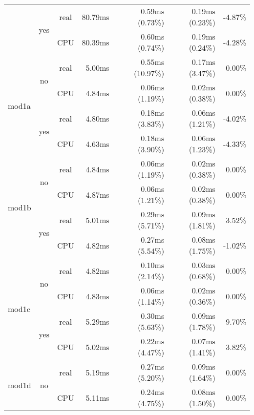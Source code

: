 \documentclass[en]{pracamgr}
\begin{document}
\begin{appendices}
\begin{small}
\begin{longtable}{|l|c|c|r|r|r|r|}
                          \cline{2-7}
                          & \multirow{2}{*}{yes} & real & 80.79ms & 0.59ms (0.73\%) & 0.19ms (0.23\%) & -4.87\% \\*
                          &                      & CPU  & 80.39ms & 0.60ms (0.74\%) & 0.19ms (0.24\%) & -4.28\% \\
\hline
\multirow{4}{*}{mod1a}    & \multirow{2}{*}{no}  & real & 5.00ms & 0.55ms (10.97\%) & 0.17ms (3.47\%) & 0.00\% \\*
                          &                      & CPU  & 4.84ms & 0.06ms (1.19\%) & 0.02ms (0.38\%) & 0.00\% \\*
                          \cline{2-7}
                          & \multirow{2}{*}{yes} & real & 4.80ms & 0.18ms (3.83\%) & 0.06ms (1.21\%) & -4.02\% \\*
                          &                      & CPU  & 4.63ms & 0.18ms (3.90\%) & 0.06ms (1.23\%) & -4.33\% \\
\hline
\multirow{4}{*}{mod1b}    & \multirow{2}{*}{no}  & real & 4.84ms & 0.06ms (1.19\%) & 0.02ms (0.38\%) & 0.00\% \\*
                          &                      & CPU  & 4.87ms & 0.06ms (1.21\%) & 0.02ms (0.38\%) & 0.00\% \\*
                          \cline{2-7}
                          & \multirow{2}{*}{yes} & real & 5.01ms & 0.29ms (5.71\%) & 0.09ms (1.81\%) & 3.52\% \\*
                          &                      & CPU  & 4.82ms & 0.27ms (5.54\%) & 0.08ms (1.75\%) & -1.02\% \\
\hline
\multirow{4}{*}{mod1c}    & \multirow{2}{*}{no}  & real & 4.82ms & 0.10ms (2.14\%) & 0.03ms (0.68\%) & 0.00\% \\*
                          &                      & CPU  & 4.83ms & 0.06ms (1.14\%) & 0.02ms (0.36\%) & 0.00\% \\*
                          \cline{2-7}
                          & \multirow{2}{*}{yes} & real & 5.29ms & 0.30ms (5.63\%) & 0.09ms (1.78\%) & 9.70\% \\*
                          &                      & CPU  & 5.02ms & 0.22ms (4.47\%) & 0.07ms (1.41\%) & 3.82\% \\
\hline
\multirow{4}{*}{mod1d}    & \multirow{2}{*}{no}  & real & 5.19ms & 0.27ms (5.20\%) & 0.09ms (1.64\%) & 0.00\% \\*
                          &                      & CPU  & 5.11ms & 0.24ms (4.75\%) & 0.08ms (1.50\%) & 0.00\% \\*

\end{longtable}
\end{small}
\end{appendices}
\end{document}
